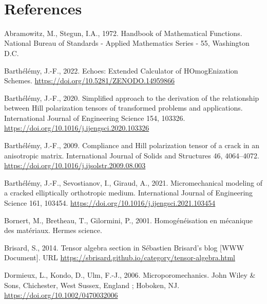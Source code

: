 \documentclass[
  letterpaper,
  DIV=11,
  numbers=noendperiod]{scrreprt}
\newlength{\cslhangindent}
\newenvironment{CSLReferences}[2] %
 {\begin{list}{}{%
  \setlength{\itemindent}{0pt}
  \setlength{\leftmargin}{0pt}
  \setlength{\parsep}{0pt}
  \ifodd #1
   \setlength{\leftmargin}{\cslhangindent}
   \setlength{\itemindent}{-1\cslhangindent}
  \fi
  \setlength{\itemsep}{#2\baselineskip}}}
 {\end{list}}
\begin{document}
\(\,\)


\chapter*{References}\label{references}


\label{refs}
\begin{CSLReferences}{1}{0}
Abramowitz, M., Stegun, I.A., 1972. Handbook of {Mathematical
Functions}. National Bureau of Standards - Applied Mathematics Series -
55, Washington D.C.

Barthélémy, J.-F., 2022. Echoes: {Extended Calculator} of
{HOmogEnization Schemes}. \url{https://doi.org/10.5281/ZENODO.14959866}

Barthélémy, J.-F., 2020. Simplified approach to the derivation of the
relationship between {Hill} polarization tensors of transformed problems
and applications. International Journal of Engineering Science 154,
103326. \url{https://doi.org/10.1016/j.ijengsci.2020.103326}

Barthélémy, J.-F., 2009. Compliance and {Hill} polarization tensor of a
crack in an anisotropic matrix. International Journal of Solids and
Structures 46, 4064--4072.
\url{https://doi.org/10.1016/j.ijsolstr.2009.08.003}

Barthélémy, J.-F., Sevostianov, I., Giraud, A., 2021. Micromechanical
modeling of a cracked elliptically orthotropic medium. International
Journal of Engineering Science 161, 103454.
\url{https://doi.org/10.1016/j.ijengsci.2021.103454}

Bornert, M., Bretheau, T., Gilormini, P., 2001. Homogénéisation en
mécanique des matériaux. Hermes science.

Brisard, S., 2014. Tensor algebra section in {Sébastien Brisard}'s blog
{[}WWW Document{]}. URL
\url{https://sbrisard.github.io/category/tensor-algebra.html}

Dormieux, L., Kondo, D., Ulm, F.-J., 2006. Microporomechanics. John
Wiley \& Sons, Chichester, West Sussex, England ; Hoboken, NJ.
\url{https://doi.org/10.1002/0470032006}


\end{CSLReferences}
\end{document}
